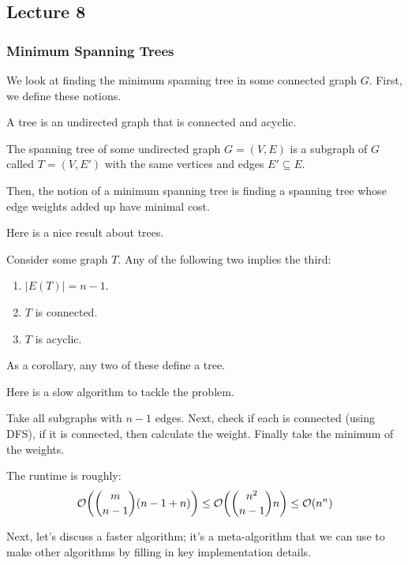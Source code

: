 \subsection{Lecture 8}

\subsubsection{Minimum Spanning Trees}
We look at finding the minimum spanning tree in some connected graph $G$. First, we define these notions.

\begin{definition} [Tree]
    A tree is an undirected graph that is connected and acyclic.
\end{definition}

\begin{definition} 
    The spanning tree of some undirected graph $G = (V, E)$ is a subgraph of $G$ called $T = (V, E')$ with the same vertices and edges $E' \subseteq E$.
\end{definition}

Then, the notion of a minimum spanning tree is finding a spanning tree whose edge weights added up have minimal cost.

Here is a nice result about trees.
\begin{theorem}
    Consider some graph $T$. Any of the following two implies the third:
    \begin{enumerate}
        \item $|E(T)| = n - 1$.
        \item $T$ is connected.
        \item $T$ is acyclic.
    \end{enumerate}
    As a corollary, any two of these define a tree.
\end{theorem}

Here is a slow algorithm to tackle the problem.
\begin{algothm} 
    Take all subgraphs with $n - 1$ edges. Next, check if each is connected (using DFS), if it is connected, then calculate the weight.
    Finally take the minimum of the weights.

    The runtime is roughly:
    \[\mathcal{O}\qty(\binom{m}{n - 1} (n - 1 + n)) \leq \mathcal{O}\qty(\binom{n^2}{n - 1}n) \leq \mathcal{O}(n^n) \]
\end{algothm}

Next, let's discuss a faster algorithm; it's a meta-algorithm that we can use to make other algorithms
by filling in key implementation details.

